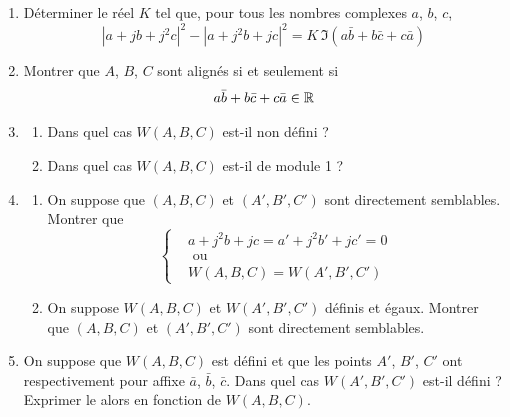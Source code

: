 \begin{enumerate}
\item Déterminer le réel $K$ tel que, pour tous les nombres complexes $a$, $b$, $c$,
\begin{displaymath}
 \left| a + jb +j^2c\right|^2 - \left| a + j^2b +jc\right|^2 = 
K \,\Im(a\bar{b} + b\bar{c} + c\bar{a}) 
\end{displaymath}

\item Montrer que $A$, $B$, $C$ sont alignés si et seulement si
\begin{displaymath}
 a\bar{b} + b\bar{c} + c\bar{a} \in \mathbb{R}
\end{displaymath}

\item
\begin{enumerate}
 \item Dans quel cas $W(A,B,C)$ est-il non défini ?
 \item Dans quel cas $W(A,B,C)$ est-il de module 1 ?
\end{enumerate}

\item 
\begin{enumerate}
 \item On suppose que $(A,B,C)$ et $(A',B',C')$ sont directement semblables. Montrer que
\begin{displaymath}
 \left\lbrace 
\begin{aligned}
 &a + j^2b +jc = a' + j^2b' +jc' =0 \\
&\text{ ou }\\
 &W(A,B,C) = W(A',B',C')
\end{aligned}
\right. 
\end{displaymath}

\item On suppose $W(A,B,C)$ et $W(A',B',C')$ définis et égaux. Montrer que $(A,B,C)$ et $(A',B',C')$ sont directement semblables.
\end{enumerate}

\item On suppose que $W(A,B,C)$ est défini et que les points $A'$, $B'$, $C'$ ont respectivement pour affixe $\bar{a}$, $\bar{b}$, $\bar{c}$. Dans quel cas $W(A',B',C')$ est-il défini ? Exprimer le alors en fonction de $W(A,B,C)$.
\end{enumerate}

